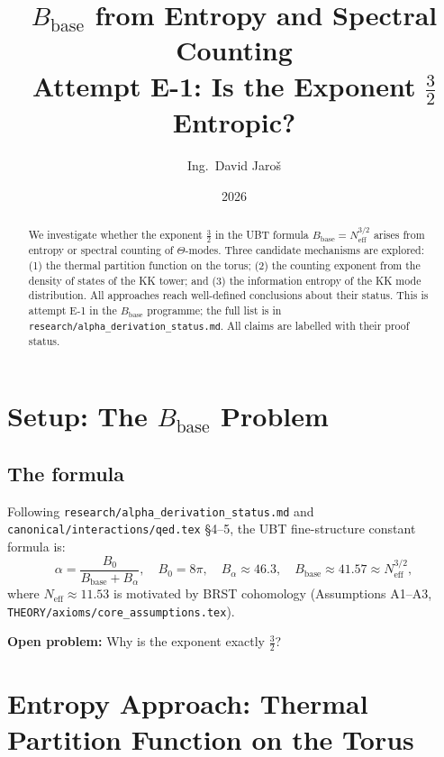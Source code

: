 \documentclass[11pt,a4paper]{article}
\title{$B_{\mathrm{base}}$ from Entropy and Spectral Counting\\
\large Attempt E-1: Is the Exponent $\tfrac{3}{2}$ Entropic?}
\author{Ing.\ David Jaroš}
\date{2026}
\begin{document}
\maketitle

\begin{abstract}
We investigate whether the exponent $\tfrac{3}{2}$ in the UBT formula
$B_{\mathrm{base}} = N_{\mathrm{eff}}^{3/2}$ arises from entropy or spectral
counting of $\Theta$-modes.  Three candidate mechanisms are explored:
(1) the thermal partition function on the torus; (2) the counting exponent
from the density of states of the KK tower; and (3) the information entropy
of the KK mode distribution.  All approaches reach well-defined conclusions
about their status.  This is attempt E-1 in the $B_{\mathrm{base}}$ programme;
the full list is in \texttt{research/alpha\_derivation\_status.md}.
All claims are labelled with their proof status.
\end{abstract}

\tableofcontents

\section{Setup: The $B_{\mathrm{base}}$ Problem}
\label{sec:setup}

\subsection{The formula}

Following \texttt{research/alpha\_derivation\_status.md} and
\texttt{canonical/interactions/qed.tex} §4--5, the UBT fine-structure constant
formula is:
\begin{equation}
\label{eq:alpha_formula}
  \alpha = \frac{B_0}{B_{\mathrm{base}} + B_\alpha},
  \quad B_0 = 8\pi, \quad B_\alpha \approx 46.3,
  \quad B_{\mathrm{base}} \approx 41.57 \approx N_{\mathrm{eff}}^{3/2},
\end{equation}
where $N_{\mathrm{eff}} \approx 11.53$ is motivated by BRST cohomology
(Assumptions A1--A3, \texttt{THEORY/axioms/core\_assumptions.tex}).

\textbf{Open problem:} Why is the exponent exactly $\tfrac{3}{2}$?

\section{Entropy Approach: Thermal Partition Function on the Torus}
\label{sec:thermal}
\end{document}
